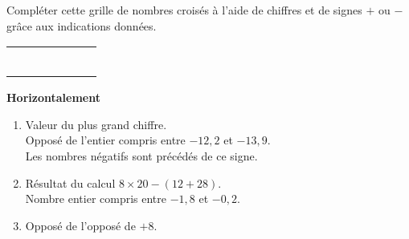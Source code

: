 \Recreation

\begin{enigme}
   Compléter cette grille de nombres croisés à l'aide de chiffres et de signes \og $+$ \fg{} ou \og $-$ \fg{} grâce aux indications données.
   \begin{center}
   {
   \begin{tabular}{|*{7}{C{0.57}|}}
      \hline
      &  &  &  &  &  &  \\
      \hline
       & &  & & &  & \\
      \hline
       & & & &  & & \\
      \hline
       & &  &  & & &  \\
      \hline
       &  & & &  &  & \\
      \hline
       & & &  & & & \\
      \hline
       & &  & & & &  \\
      \hline
   \end{tabular}}
   \end{center}
   \bigskip
   \begin{multicols}{2}
   {\bf Horizontalement} \\
   \begin{enumerate}
      \item Valeur du plus grand chiffre. \\
         Opposé de l'entier compris entre $-12,2$ et $-13,9$. \\
         Les nombres négatifs sont précédés de ce signe. \\
      \item Résultat du calcul $8\times20-(12+28)$. \\
         Nombre entier compris entre $-1,8$ et $-0,2$. \\
      \item Opposé de l’opposé de $+8$. \\

\end{enumerate}
\end{multicols}
\end{enigme}

